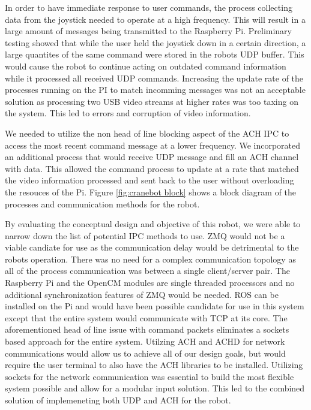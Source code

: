 In order to have immediate response to user commands, the process collecting data from the joystick needed to operate at a high frequency. This will result in a large amount of messages being transmitted to the Raspberry Pi. Preliminary testing showed that while the user held the joystick down in a certain direction, a large quantites of the same command were stored in the robots UDP buffer. This would cause the robot to continue acting on outdated command information while it processed all received UDP commands. Increasing the update rate of the processes running on the PI to match incomming messages was not an acceptable solution as processing two USB video streams at higher rates was too taxing on the system. This led to errors and corruption of video information.

We needed to utilize the non head of line blocking aspect of the ACH IPC to access the most recent command message at a lower frequency. We incorporated an additional process that would receive UDP message and fill an ACH channel with data. This allowed the command process to update at a rate that matched the video information processed and sent back to the user without overloading the resouces of the Pi. Figure \ref{fig:cranebot block} shows a block diagram of the processes and communication methods for the robot.


By evaluating the conceptual design and objective of this robot, we were able to narrow down the list of potential IPC methods to use. ZMQ would not be a viable candiate for use as the communication delay would be detrimental to the robots operation. There was no need for a complex communication topology as all of the process communication was between a single client/server pair. The Raspberry Pi and the OpenCM modules are single threaded processors and no additional synchronization features of ZMQ would be needed. ROS can be installed on the Pi and would have been possible candidate for use in this system except that the entire system would communicate with TCP at its core. The aforementioned head of line issue with command packets eliminates a sockets based approach for the entire system. Utilzing ACH and ACHD for network communications would allow us to achieve all of our design goals, but would require the user terminal to also have the ACH libraries to be installed. Utilizing sockets for the network communication was essential to build the most flexible system possible and allow for a modular input solution. This led to the combined solution of implemeneting both UDP and ACH for the robot. 
